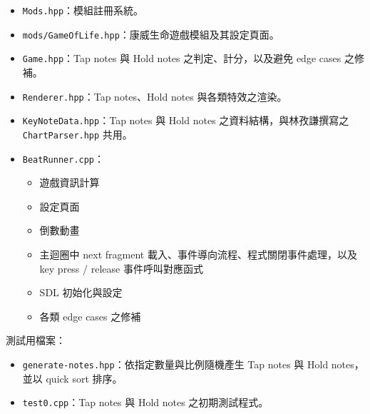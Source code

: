 \documentclass[a4paper,12pt]{article}
\begin{document}
\begin{itemize}
\item \verb|Mods.hpp|：模組註冊系統。
\item \verb|mods/GameOfLife.hpp|：康威生命遊戲模組及其設定頁面。
\item \verb|Game.hpp|：Tap notes 與 Hold notes 之判定、計分，以及避免 edge cases 之修補。
\item \verb|Renderer.hpp|：Tap notes、Hold notes 與各類特效之渲染。
\item \verb|KeyNoteData.hpp|：Tap notes 與 Hold notes 之資料結構，與林孜謙撰寫之 \verb|ChartParser.hpp| 共用。
\item \verb|BeatRunner.cpp|：
\begin{itemize}
  \item 遊戲資訊計算
  \item 設定頁面
  \item 倒數動畫
  \item 主迴圈中 next fragment 載入、事件導向流程、程式關閉事件處理，以及 key press / release 事件呼叫對應函式
  \item SDL 初始化與設定
  \item 各類 edge cases 之修補
\end{itemize}
\end{itemize}
測試用檔案：
\begin{itemize}
\item \verb|generate-notes.hpp|：依指定數量與比例隨機產生 Tap notes 與 Hold notes，並以 quick sort 排序。
\item \verb|test0.cpp|：Tap notes 與 Hold notes 之初期測試程式。
\end{itemize}
\end{document}
